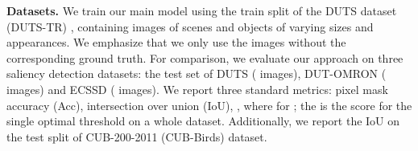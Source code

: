 \documentclass{article}
\begin{document}
\textbf{Datasets.} We train our main model using the train split of the DUTS dataset (DUTS-TR) \cite{wang2017learningDUTS}, containing  images of scenes and objects of varying sizes and appearances. We emphasize that we only use the images without the corresponding ground truth. For comparison, we evaluate our approach on three saliency detection datasets: the test set of DUTS ( images), DUT-OMRON \cite{yang2013saliency} ( images) and ECSSD \cite{shi2015hierarchical} ( images). We report three standard metrics: pixel mask accuracy (Acc), intersection over union (IoU), , where  for ; the  is the score for the single optimal threshold on a whole dataset. Additionally, we report the IoU on the test split \cite{chen2019unsupervisedRedo} of CUB-200-2011 (CUB-Birds) \cite{WahCUB_200_2011} dataset.\\
\end{document}

